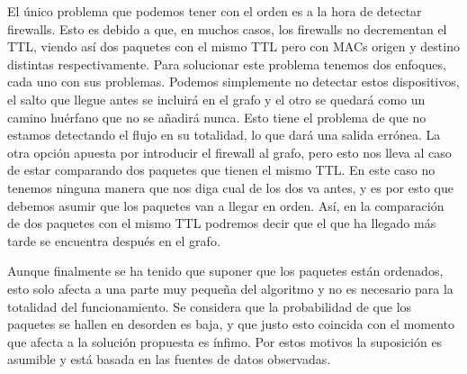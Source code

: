 \documentclass[twoside, 12pt]{epstfg}
\begin{document}
El único problema que podemos tener con el orden es a la hora de detectar firewalls. Esto es debido a que, en muchos casos, los firewalls no decrementan el TTL, viendo así dos paquetes con el mismo TTL pero con MACs origen y destino distintas respectivamente. Para solucionar este problema tenemos dos enfoques, cada uno con sus problemas. Podemos simplemente no detectar estos dispositivos, el salto que llegue antes se incluirá en el grafo y el otro se quedará como un camino huérfano que no se añadirá nunca. Esto tiene el problema de que no estamos detectando el flujo en su totalidad, lo que dará una salida errónea. La otra opción apuesta por introducir el firewall al grafo, pero esto nos lleva al caso de estar comparando dos paquetes que tienen el mismo TTL. En este caso no tenemos ninguna manera que nos diga cual de los dos va antes, y es por esto que debemos asumir que los paquetes van a llegar en orden. Así, en la comparación de dos paquetes con el mismo TTL podremos decir que el que ha llegado más tarde se encuentra después en el grafo.

Aunque finalmente se ha tenido que suponer que los paquetes están ordenados, esto solo afecta a una parte muy pequeña del algoritmo y no es necesario para la totalidad del funcionamiento. Se considera que la probabilidad de que los paquetes se hallen en desorden es baja, y que justo esto coincida con el momento que afecta a la solución propuesta es ínfimo. Por estos motivos la suposición es asumible y está basada en las fuentes de datos observadas. %
\end{document}
